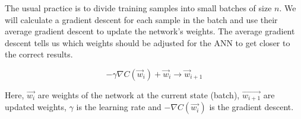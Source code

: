The usual practice is to divide training samples into small batches of size $n$. We will calculate a gradient descent for each sample in the batch and use their average gradient descent to update the network's weights. The average gradient descent tells us which weights should be adjusted for the ANN to get closer to the correct results.\cite{birlliantbackprop}

\begin{equation}
    {- \gamma \nabla C(\vec{w}_i) + \vec{w}_i \rightarrow \vec{w}_{i+1} }
\end{equation}

Here, $\vec{w_i}$ are weights of the network at the current state (batch), $\vec{w_{i+1}}$ are updated weights, $\gamma$ is the learning rate and $-\nabla C(\vec{w_i})$ is the gradient descent.
